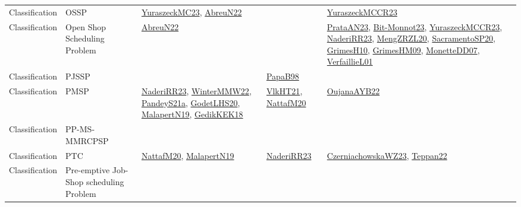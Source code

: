 {\begin{longtable}{lp{3cm}>{\raggedright}p{6cm}>{\raggedright}p{6cm}p{8cm}}
Classification & OSSP & \href{papers/YuraszeckMC23.pdf}{YuraszeckMC23}\cite{YuraszeckMC23}, \href{articles/AbreuN22.pdf}{AbreuN22}\cite{AbreuN22} &  & \href{articles/YuraszeckMCCR23.pdf}{YuraszeckMCCR23}\cite{YuraszeckMCCR23}\\
Classification & Open Shop Scheduling Problem & \href{articles/AbreuN22.pdf}{AbreuN22}\cite{AbreuN22} &  & \href{articles/PrataAN23.pdf}{PrataAN23}\cite{PrataAN23}, \href{papers/Bit-Monnot23.pdf}{Bit-Monnot23}\cite{Bit-Monnot23}, \href{articles/YuraszeckMCCR23.pdf}{YuraszeckMCCR23}\cite{YuraszeckMCCR23}, \href{articles/NaderiRR23.pdf}{NaderiRR23}\cite{NaderiRR23}, \href{articles/MengZRZL20.pdf}{MengZRZL20}\cite{MengZRZL20}, \href{articles/SacramentoSP20.pdf}{SacramentoSP20}\cite{SacramentoSP20}, \href{papers/GrimesH10.pdf}{GrimesH10}\cite{GrimesH10}, \href{papers/GrimesHM09.pdf}{GrimesHM09}\cite{GrimesHM09}, \href{papers/MonetteDD07.pdf}{MonetteDD07}\cite{MonetteDD07}, \href{papers/VerfaillieL01.pdf}{VerfaillieL01}\cite{VerfaillieL01}\\
Classification & PJSSP &  & \href{articles/PapaB98.pdf}{PapaB98}\cite{PapaB98} & \\
Classification & PMSP & \href{articles/NaderiRR23.pdf}{NaderiRR23}\cite{NaderiRR23}, \href{papers/WinterMMW22.pdf}{WinterMMW22}\cite{WinterMMW22}, \href{articles/PandeyS21a.pdf}{PandeyS21a}\cite{PandeyS21a}, \href{papers/GodetLHS20.pdf}{GodetLHS20}\cite{GodetLHS20}, \href{papers/MalapertN19.pdf}{MalapertN19}\cite{MalapertN19}, \href{articles/GedikKEK18.pdf}{GedikKEK18}\cite{GedikKEK18} & \href{articles/VlkHT21.pdf}{VlkHT21}\cite{VlkHT21}, \href{papers/NattafM20.pdf}{NattafM20}\cite{NattafM20} & \href{papers/OujanaAYB22.pdf}{OujanaAYB22}\cite{OujanaAYB22}\\
Classification & PP-MS-MMRCPSP &  &  & \\
Classification & PTC & \href{papers/NattafM20.pdf}{NattafM20}\cite{NattafM20}, \href{papers/MalapertN19.pdf}{MalapertN19}\cite{MalapertN19} & \href{articles/NaderiRR23.pdf}{NaderiRR23}\cite{NaderiRR23} & \href{articles/CzerniachowskaWZ23.pdf}{CzerniachowskaWZ23}\cite{CzerniachowskaWZ23}, \href{papers/Teppan22.pdf}{Teppan22}\cite{Teppan22}\\
Classification & Pre-emptive Job-Shop scheduling Problem &  &  & \\

\end{longtable}}
